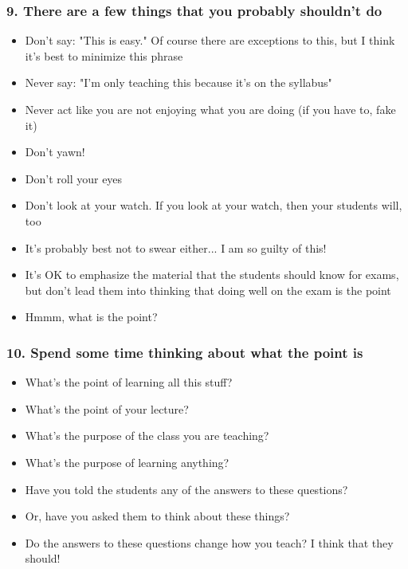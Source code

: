 \documentclass{beamer}
\begin{document}
\begin{frame}
\frametitle{9. There are a few things that you probably shouldn't do}
\begin{itemize}
	\pause 
  \item Don't say: \pause "This is easy." \pause Of course there are exceptions to this, but I think it's best to minimize this phrase
    	\pause 
  \item Never say: \pause "I'm only teaching this because it's on the syllabus"
  	\pause
  \item Never act like you are not enjoying what you are doing (if you have to, fake it)
      	\pause 
  \item Don't yawn!
  	\pause
  \item Don't roll your eyes
  	\pause
  \item Don't look at your watch.  \pause If you look at your watch, then your students will, too
  	\pause
  \item It's probably best not to swear either... \pause I am so guilty of this!
  	\pause
 \item It's OK to emphasize the material that the students should know for exams, but don't lead them into thinking that doing well on the exam is the point
	\pause
  \item Hmmm, what is the point?
\end{itemize}
\end{frame}

\begin{frame}
\frametitle{10. Spend some time thinking about what the point is}
\begin{itemize}
	\pause 
  \item What's the point of learning all this stuff?
  	\pause
  \item What's the point of your lecture?
      	\pause 
  \item What's the purpose of the class you are teaching?
  	\pause 
  \item What's the purpose of learning anything?
  	\pause
  \item Have you told the students any of the answers to these questions?
  	\pause
  \item Or, have you asked them to think about these things?
  	\pause
  \item Do the answers to these questions change how you teach? \pause I think that they should!
\end{itemize}
\end{frame}
\end{document}
